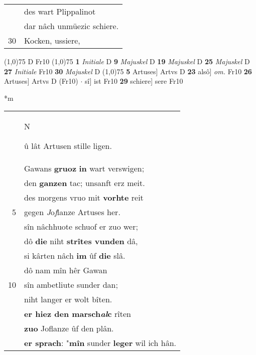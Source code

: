 \documentclass[8pt,a4paper,notitlepage]{article}
\begin{document}
\begin{table}[ht]
\begin{minipage}[t]{0.5\linewidth}
\begin{tabular}{rl}
 & des wart Plippalinot\\ 
 & dar nâch unmüezic schiere.\\ 
30 & Kocken, ussiere,\\ 
\end{tabular}
\scriptsize
\line(1,0){75} \newline
D Fr10 \newline
\line(1,0){75} \newline
\textbf{1} \textit{Initiale} D  \textbf{9} \textit{Majuskel} D  \textbf{19} \textit{Majuskel} D  \textbf{25} \textit{Majuskel} D  \textbf{27} \textit{Initiale} Fr10  \textbf{30} \textit{Majuskel} D  \newline
\line(1,0){75} \newline
\textbf{5} Artuses] Artvs D \textbf{23} alsô] \textit{om.} Fr10 \textbf{26} Artuses] Artvs D (Fr10)  $\cdot$ sî] ist Fr10 \textbf{29} schiere] sere Fr10 \newline
\end{minipage}
\hspace{0.5cm}
\begin{minipage}[t]{0.5\linewidth}
\small
\begin{center}*m
\end{center}
\begin{tabular}{rl}
 & \begin{large}N\end{large}û lât Artusen stille ligen.\\ 
 & Gawans \textbf{gruoz} \textbf{in} wart verswigen;\\ 
 & den \textbf{ganzen} tac; unsanft erz meit.\\ 
 & des morgens vruo mit \textbf{vorhte} reit\\ 
5 & gegen \textit{J}o\textit{f}lanze Artuses her.\\ 
 & sîn nâchhuote schuof er zuo wer;\\ 
 & dô \textbf{die} niht \textbf{strîtes vunden} dâ,\\ 
 & si kârten nâch \textbf{im} ûf \textbf{die} slâ.\\ 
 & dô nam mîn hêr Gawan\\ 
10 & sîn ambetliute sunder dan;\\ 
 & niht langer er wolt bîten.\\ 
 & \textbf{er hiez den marsch\textit{al}c} rîten\\ 
 & \textbf{zuo} Joflanze ûf den plân.\\ 
 & \textbf{er sprach}: "\textbf{mîn} sunder \textbf{leger} wil ich hân.\\ 

\end{tabular}
\end{minipage}
\end{table}
\end{document}
